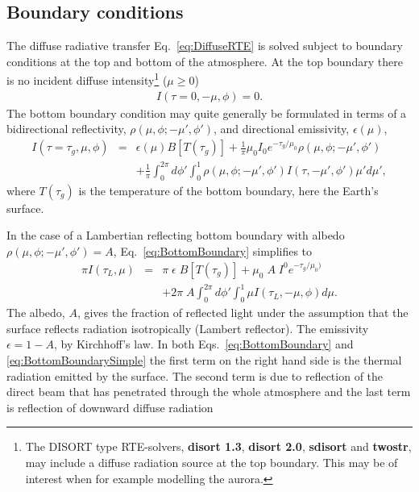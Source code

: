 \subsection{Boundary conditions}
The diffuse radiative transfer Eq.~\ref{eq:DiffuseRTE} is solved
subject to boundary conditions at the top and bottom of the
atmosphere. At the top boundary there is no incident diffuse
intensity\footnote{The DISORT type RTE-solvers, {\bf disort 1.3}, {\bf
    disort 2.0}, {\bf sdisort} and {\bf twostr}, may include a diffuse
  radiation source at the top boundary. This may be of interest when
  for example modelling the aurora.}
($\mu \ge 0$) 
\begin{eqnarray}
I(\tau=0, -\mu, \phi )=0.
  \label{eq:TopBoundary}
\end{eqnarray}
The bottom boundary condition may quite generally be formulated in
terms of a bidirectional reflectivity, $\rho(\mu,\phi;-\mu',\phi')$,
and directional emissivity, $\epsilon(\mu)$,
\begin{eqnarray}
  I(\tau=\tau_g, \mu, \phi ) &=& \epsilon(\mu) B[T(\tau_{g})]
  + \frac{1}{\pi} \mu_0 I_0 e^{-\tau_g/\mu_{0}}
  \rho(\mu,\phi;-\mu',\phi') \nonumber \\
  && +\frac{1}{\pi} \int_0^{2\pi} d\phi' \int_0^1
  \rho(\mu,\phi;-\mu',\phi')  I(\tau,-\mu', \phi') \mu' d\mu' ,
  \label{eq:BottomBoundary}
\end{eqnarray}
where $T(\tau_{g})$ is the temperature of the bottom boundary, here
the Earth's surface.

In the case of a Lambertian reflecting bottom boundary with albedo
$\rho(\mu,\phi;-\mu',\phi')=A$,
Eq.~\ref{eq:BottomBoundary} simplifies to
\begin{eqnarray}
\pi I(\tau_{L}, \mu )&=& \pi\;\epsilon \;B[T(\tau_{g})]+
\mu_{0}\;A\;I^{0}e^{-\tau_{g}/\mu_{0})} \nonumber \\
&&+ 2\pi\; A \int_0^{2\pi}
d\phi' \int_{0}^{1} \mu I(\tau_{L},-\mu, \phi) d\mu.
  \label{eq:BottomBoundarySimple}
\end{eqnarray}
The albedo, $A$, gives the fraction of reflected light under the
assumption that the surface reflects radiation isotropically (Lambert
reflector). The emissivity $\epsilon = 1-A$, by Kirchhoff's law.
In both Eqs.~\ref{eq:BottomBoundary} and
\ref{eq:BottomBoundarySimple} the first term on the right hand side is
the thermal radiation emitted by 
the surface. The second term is due to reflection of the direct beam
that has penetrated through the whole atmosphere and the last term 
is reflection of downward diffuse radiation

